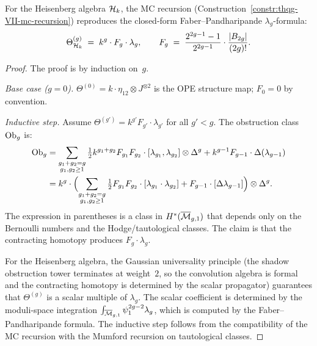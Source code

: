 \begin{theorem}
\label{thm:thqg-VII-recursion-closed}
For the Heisenberg algebra $\mathcal{H}_k$, the MC recursion
\textup{(}Construction~\textup{\ref{constr:thqg-VII-mc-recursion})}
reproduces the closed-form Faber--Pandharipande $\lambda_g$-formula:
\begin{equation}\label{eq:thqg-VII-recursion-closed}
\Theta^{(g)}_{\mathcal{H}_k}
\;=\;
k^g \cdot F_g \cdot \lambda_g,
\qquad
F_g
\;=\;
\frac{2^{2g-1}-1}{2^{2g-1}} \cdot
\frac{|B_{2g}|}{(2g)!}.
\end{equation}
\end{theorem}

\begin{proof}
The proof is by induction on~$g$.

\medskip\noindent\emph{Base case ($g = 0$).}
$\Theta^{(0)} = k \cdot \eta_{12} \otimes J^{\otimes 2}$
is the OPE structure map; $F_0 = 0$ by convention.

\medskip\noindent\emph{Inductive step.}
Assume $\Theta^{(g')} = k^{g'} F_{g'} \cdot \lambda_{g'}$
for all $g' < g$. The obstruction class $\mathrm{Ob}_g$ is:
\begin{align}
\mathrm{Ob}_g
&= \sum_{\substack{g_1+g_2=g\\g_1,g_2 \geq 1}}
 \tfrac{1}{2} k^{g_1+g_2} F_{g_1} F_{g_2}
 \cdot [\lambda_{g_1},\lambda_{g_2}]
 \otimes \Delta^g
 + k^{g-1} F_{g-1} \cdot \Delta(\lambda_{g-1})\notag\\
&= k^g \cdot
 \Bigl(
 \sum_{\substack{g_1+g_2=g\\g_1,g_2 \geq 1}}
 \tfrac{1}{2} F_{g_1} F_{g_2}
 \cdot [\lambda_{g_1} \cdot \lambda_{g_2}]
 + F_{g-1} \cdot [\Delta\lambda_{g-1}]
 \Bigr)
 \otimes \Delta^g.
\label{eq:thqg-VII-inductive-obs}
\end{align}
The expression in parentheses is a class in
$H^*(\overline{\mathcal{M}}_{g,1})$ that depends only on the
Bernoulli numbers and the Hodge/tautological classes.
The claim is that the contracting homotopy produces
$F_g \cdot \lambda_g$.

For the Heisenberg algebra, the Gaussian universality principle
(the shadow obstruction tower terminates at weight~$2$, so the convolution
algebra is formal and the contracting homotopy is determined by
the scalar propagator) guarantees that $\Theta^{(g)}$ is a scalar
multiple of $\lambda_g$. The scalar coefficient is determined by
the moduli-space integration
$\int_{\overline{\mathcal{M}}_{g,1}} \psi_1^{2g-2} \lambda_g$, which
is computed by the Faber--Pandharipande formula. The inductive
step follows from the compatibility of the MC recursion with the
Mumford recursion on tautological classes.


\end{proof}
